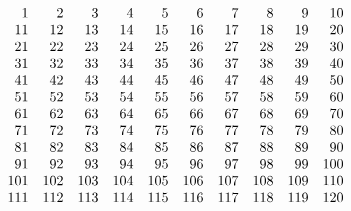 \documentclass[nooutcomes]{ximera}
\begin{document}
\begin{problem}
\[
\begin{array}{r r r r r r r r r r}
  1 &   2 &   3 &   4 &   5 &   6 &   7 &   8 &   9 &  10\\
 11 &  12 &  13 &  14 &  15 &  16 &  17 &  18 &  19 &  20\\
 21 &  22 &  23 &  24 &  25 &  26 &  27 &  28 &  29 &  30\\
 31 &  32 &  33 &  34 &  35 &  36 &  37 &  38 &  39 &  40\\
 41 &  42 &  43 &  44 &  45 &  46 &  47 &  48 &  49 &  50\\
 51 &  52 &  53 &  54 &  55 &  56 &  57 &  58 &  59 &  60\\
 61 &  62 &  63 &  64 &  65 &  66 &  67 &  68 &  69 &  70\\
 71 &  72 &  73 &  74 &  75 &  76 &  77 &  78 &  79 &  80\\
 81 &  82 &  83 &  84 &  85 &  86 &  87 &  88 &  89 &  90\\
 91 &  92 &  93 &  94 &  95 &  96 &  97 &  98 &  99 & 100\\
101 & 102 & 103 & 104 & 105 & 106 & 107 & 108 & 109 & 110\\
111 & 112 & 113 & 114 & 115 & 116 & 117 & 118 & 119 & 120\\
\end{array}
\]
\end{problem}


\end{document}
